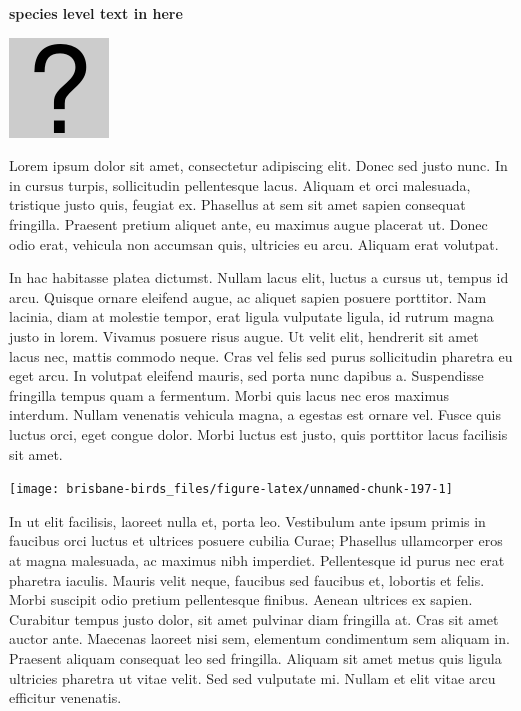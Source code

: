 \documentclass[]{book}
\let\origfigure\figure
\let\endorigfigure\endfigure
\renewenvironment{figure}[1][2] {
  \expandafter\origfigure\expandafter[H]
} {
  \endorigfigure
}
\begin{document}
\textbf{species level text in here}

\begin{figure}
\centering
\includegraphics{assets/missing.png}
\caption{No image for species}
\end{figure}

Lorem ipsum dolor sit amet, consectetur adipiscing elit. Donec sed justo
nunc. In in cursus turpis, sollicitudin pellentesque lacus. Aliquam et
orci malesuada, tristique justo quis, feugiat ex. Phasellus at sem sit
amet sapien consequat fringilla. Praesent pretium aliquet ante, eu
maximus augue placerat ut. Donec odio erat, vehicula non accumsan quis,
ultricies eu arcu. Aliquam erat volutpat.

In hac habitasse platea dictumst. Nullam lacus elit, luctus a cursus ut,
tempus id arcu. Quisque ornare eleifend augue, ac aliquet sapien posuere
porttitor. Nam lacinia, diam at molestie tempor, erat ligula vulputate
ligula, id rutrum magna justo in lorem. Vivamus posuere risus augue. Ut
velit elit, hendrerit sit amet lacus nec, mattis commodo neque. Cras vel
felis sed purus sollicitudin pharetra eu eget arcu. In volutpat eleifend
mauris, sed porta nunc dapibus a. Suspendisse fringilla tempus quam a
fermentum. Morbi quis lacus nec eros maximus interdum. Nullam venenatis
vehicula magna, a egestas est ornare vel. Fusce quis luctus orci, eget
congue dolor. Morbi luctus est justo, quis porttitor lacus facilisis sit
amet.

\begin{figure}
\texttt{[image: brisbane-birds\_files/figure-latex/unnamed-chunk-197-1]} \caption{insert figure caption}\label{fig:unnamed-chunk-197}
\end{figure}

In ut elit facilisis, laoreet nulla et, porta leo. Vestibulum ante ipsum
primis in faucibus orci luctus et ultrices posuere cubilia Curae;
Phasellus ullamcorper eros at magna malesuada, ac maximus nibh
imperdiet. Pellentesque id purus nec erat pharetra iaculis. Mauris velit
neque, faucibus sed faucibus et, lobortis et felis. Morbi suscipit odio
pretium pellentesque finibus. Aenean ultrices ex sapien. Curabitur
tempus justo dolor, sit amet pulvinar diam fringilla at. Cras sit amet
auctor ante. Maecenas laoreet nisi sem, elementum condimentum sem
aliquam in. Praesent aliquam consequat leo sed fringilla. Aliquam sit
amet metus quis ligula ultricies pharetra ut vitae velit. Sed sed
vulputate mi. Nullam et elit vitae arcu efficitur venenatis.
\end{document}
